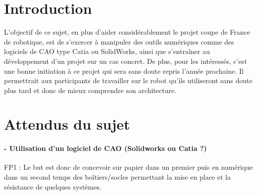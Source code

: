 \documentclass[fleqn,10pt]{SelfArx} %
\begin{document}
\flushbottom %

\maketitle %

\tableofcontents %

\thispagestyle{empty} %


\section*{Introduction} %


L'objectif de ce sujet, en plus d'aider considérablement le projet coupe de France de robotique, est de s'exercer à manipuler des outils numériques comme des logiciels de CAO type Catia ou SolidWorks, ainsi que s'entraîner au développement d'un projet sur un cas concret. De plus, pour les intéressés, c'est une bonne initiation à ce projet qui sera sans doute repris l'année prochaine. Il permettrait aux participants de travailler sur le robot qu'ils utiliseront sans doute plus tard et donc de mieux comprendre son architecture.



\section{Attendus du sujet}

\paragraph{- Utilisation d’un logiciel de CAO (Solidworks ou Catia ?)}
FP1 : Le but est donc de concevoir sur papier dans un premier puis en numérique dans un second temps des boîtiers/socles permettant la mise en place et la résistance de quelques systèmes.
\end{document}

